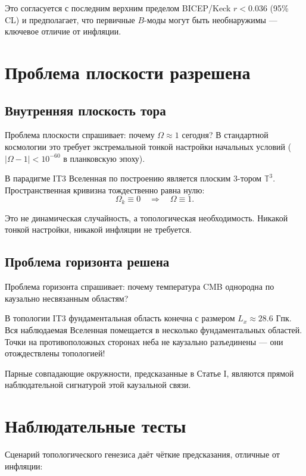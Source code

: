 \documentclass[12pt,a4paper]{article}
\begin{document}
Это согласуется с последним верхним пределом BICEP/Keck $r < 0.036$ (95\% CL) \citep{BICEP2021} и предполагает, что первичные $B$-моды могут быть необнаружимы — ключевое отличие от инфляции.

\section{Проблема плоскости разрешена}

\subsection{Внутренняя плоскость тора}

Проблема плоскости спрашивает: почему $\Omega \approx 1$ сегодня? В стандартной космологии это требует экстремальной тонкой настройки начальных условий ($|\Omega - 1| < 10^{-60}$ в планковскую эпоху).

В парадигме IT3 Вселенная по построению является плоским 3-тором $\mathbb{T}^3$. Пространственная кривизна тождественно равна нулю:
\begin{equation}
\Omega_k \equiv 0 \quad \Rightarrow \quad \Omega \equiv 1.
\end{equation}

Это не динамическая случайность, а топологическая необходимость. Никакой тонкой настройки, никакой инфляции не требуется.

\subsection{Проблема горизонта решена}

Проблема горизонта спрашивает: почему температура CMB однородна по каузально несвязанным областям?

В топологии IT3 фундаментальная область конечна с размером $L_x \approx 28.6$ Гпк. Вся наблюдаемая Вселенная помещается в несколько фундаментальных областей. Точки на противоположных сторонах неба не каузально разъединены — они отождествлены топологией!

Парные совпадающие окружности, предсказанные в Статье I, являются прямой наблюдательной сигнатурой этой каузальной связи.

\section{Наблюдательные тесты}

Сценарий топологического генезиса даёт чёткие предсказания, отличные от инфляции:
\end{document}
